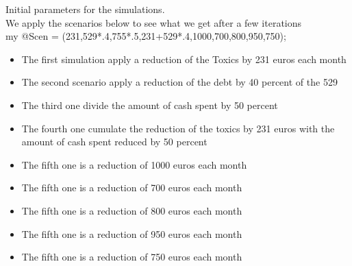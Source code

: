 \documentclass[8pt]{article} %
\begin{document}
Initial parameters for the simulations.\\


We apply the scenarios below to see what we get after a few iterations\\


my @Scen = (231,529*.4,755*.5,231+529*.4,1000,700,800,950,750);\\

\begin{itemize}
	\item{The first simulation apply a reduction of the Toxics by 231 euros each month}
	\item{The second scenario apply a reduction of the debt by 40 percent of the 529}
	\item{The third one divide the amount of cash spent by 50 percent}
	\item{The fourth one cumulate the reduction of the toxics by 231 euros with the amount of cash spent reduced by 50 percent}
	\item{The fifth one is a reduction of 1000 euros each month}
	\item{The fifth one is a reduction of 700 euros each month}
	\item{The fifth one is a reduction of 800 euros each month}
	\item{The fifth one is a reduction of 950 euros each month}
	\item{The fifth one is a reduction of 750 euros each month}
\end{itemize}
\end{document}
